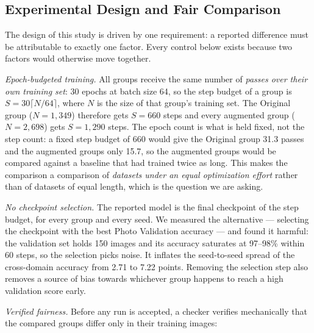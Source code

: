 \subsection{Experimental Design and Fair Comparison}
\label{sec:exp_design}

The design of this study is driven by one requirement: a reported difference must be attributable to exactly one factor. Every control below exists because two factors would otherwise move together.

\textit{Epoch-budgeted training.} All groups receive the same number of \emph{passes over their own training set}: 30 epochs at batch size 64, so the step budget of a group is $S = 30\lceil N/64\rceil$, where $N$ is the size of that group's training set. The Original group ($N = 1{,}349$) therefore gets $S = 660$ steps and every augmented group ($N = 2{,}698$) gets $S = 1{,}290$ steps. The epoch count is what is held fixed, not the step count: a fixed step budget of 660 would give the Original group 31.3 passes and the augmented groups only 15.7, so the augmented groups would be compared against a baseline that had trained twice as long. This makes the comparison a comparison of \emph{datasets under an equal optimization effort} rather than of datasets of equal length, which is the question we are asking.

\textit{No checkpoint selection.} The reported model is the final checkpoint of the step budget, for every group and every seed. We measured the alternative --- selecting the checkpoint with the best Photo Validation accuracy --- and found it harmful: the validation set holds 150 images and its accuracy saturates at 97--98\% within 60 steps, so the selection picks noise. It inflates the seed-to-seed spread of the cross-domain accuracy from 2.71 to 7.22 points. Removing the selection step also removes a source of bias towards whichever group happens to reach a high validation score early.

\textit{Verified fairness.} Before any run is accepted, a checker verifies mechanically that the compared groups differ only in their training images:
\label{sec:fairness}

